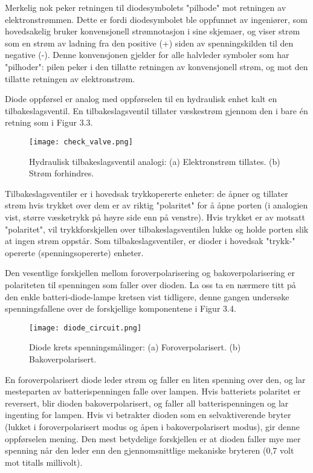 \documentclass[12pt]{report}
\begin{document}
Merkelig nok peker retningen til diodesymbolets "pilhode" mot retningen av elektronstrømmen. Dette er fordi diodesymbolet ble oppfunnet av ingeniører, som hovedsakelig bruker konvensjonell strømnotasjon i sine skjemaer, og viser strøm som en strøm av ladning fra den positive (+) siden av spenningskilden til den negative (-). Denne konvensjonen gjelder for alle halvleder symboler som har "pilhoder": pilen peker i den tillatte retningen av konvensjonell strøm, og mot den tillatte retningen av elektronstrøm.

Diode oppførsel er analog med oppførselen til en hydraulisk enhet kalt en tilbakeslagsventil. En tilbakeslagsventil tillater væskestrøm gjennom den i bare én retning som i Figur 3.3.

\begin{figure}[h]
\centering
\texttt{[image: check\_valve.png]}
\caption{Hydraulisk tilbakeslagsventil analogi: (a) Elektronstrøm tillates. (b) Strøm forhindres.}
\end{figure}

Tilbakeslagsventiler er i hovedsak trykkopererte enheter: de åpner og tillater strøm hvis trykket over dem er av riktig "polaritet" for å åpne porten (i analogien vist, større væsketrykk på høyre side enn på venstre). Hvis trykket er av motsatt "polaritet", vil trykkforskjellen over tilbakeslagsventilen lukke og holde porten slik at ingen strøm oppstår. Som tilbakeslagsventiler, er dioder i hovedsak "trykk-" opererte (spenningsopererte) enheter.

Den vesentlige forskjellen mellom foroverpolarisering og bakoverpolarisering er polariteten til spenningen som faller over dioden. La oss ta en nærmere titt på den enkle batteri-diode-lampe kretsen vist tidligere, denne gangen undersøke spenningsfallene over de forskjellige komponentene i Figur 3.4.

\begin{figure}[h]
\centering
\texttt{[image: diode\_circuit.png]}
\caption{Diode krets spenningsmålinger: (a) Foroverpolarisert. (b) Bakoverpolarisert.}
\end{figure}

En foroverpolarisert diode leder strøm og faller en liten spenning over den, og lar mesteparten av batterispenningen falle over lampen. Hvis batteriets polaritet er reversert, blir dioden bakoverpolarisert, og faller all batterispenningen og lar ingenting for lampen. Hvis vi betrakter dioden som en selvaktiverende bryter (lukket i foroverpolarisert modus og åpen i bakoverpolarisert modus), gir denne oppførselen mening. Den mest betydelige forskjellen er at dioden faller mye mer spenning når den leder enn den gjennomsnittlige mekaniske bryteren (0,7 volt mot titalls millivolt).
\end{document}
